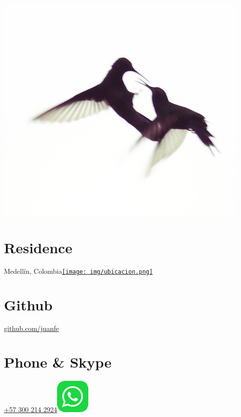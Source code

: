 \begin{aside}
    ~
    ~
    ~
    ~
    ~
    ~
  \includegraphics[scale=0.8]{img/coruscan.jpg}
    ~
  \section{Residence}
	Medellín, Colombia\href{https://www.google.com/maps/place/Laureles+-+Estadio,+Medell%C3%ADn,+Laureles,+Medell%C3%ADn,+Antioquia/@6.2546395,-75.6144257,14}{\texttt{[image: img/ubicacion.png]}}
    ~
    ~
  \section{Github}
    \href{https://github.com/juanfe}{github.com/juanfe}
  \section{Phone \& Skype}
    \href{callto:+573002142924}{+57 300 214 2924\includegraphics[scale=0.15]{img/whatsapp.png}}
    ~
    ~

\end{aside}

